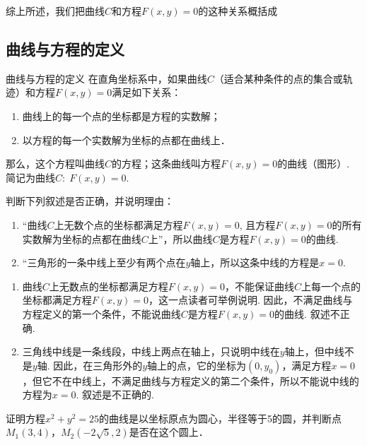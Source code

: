 综上所述，我们把曲线$C$和方程$F(x,y)=0$的这种关系概括成

\subsection{曲线与方程的定义}
\begin{thm}
    {曲线与方程的定义}
在直角坐标系中，如果曲线$C$（适合某种条件的点的集合或轨迹）和方程$F(x,y)=0$满足如下关系：
\begin{enumerate}
    \item 曲线上的每一个点的坐标都是方程的实数解；
    \item 以方程的每一个实数解为坐标的点都在曲线上．
\end{enumerate}
那么，这个方程叫曲线$C$的方程；这条曲线叫方程$F(x,y)=0$的曲线（图形）. 简记为曲线$C:\; F(x,y)=0$.
\end{thm}

\begin{example}
    判断下列叙述是否正确，并说明理由：
\begin{enumerate}[(1)]
    \item “曲线$C$上无数个点的坐标都满足方程$F(x,y)=0$, 且方程$F(x,y)=0$的所有实数解为坐标的点都在曲线$C$上”，所以曲线$C$是方程$F(x,y)=0$的曲线.
    \item “三角形的一条中线上至少有两个点在$y$轴上，所以这条中线的方程是$x=0$.
\end{enumerate}
\end{example}

\begin{solution}
\begin{enumerate}[(1)]
\item 曲线$C$上无数点的坐标都满足方程$F(x,y)=0$，不能保证曲线$C$上每一个点的坐标都满足方程$F(x,y)=0$，这一点读者可举例说明. 因此，不满足曲线与方程定义的第一个条件，不能说曲线$C$是方程$F(x,y)=0$的曲线. 叙述不正确.
\item 三角线中线是一条线段，中线上两点在轴上，只说明中线在$y$轴上，但中线不是$y$轴. 因此，在三角形外的$y$轴上的点，它的坐标为$(0,y_0)$，满足方程$x=0$，但它不在中线上，不满足曲线与方程定义的第二个条件，所以不能说中线的方程为$x=0$. 叙述是不正确的.
\end{enumerate}
\end{solution}

\begin{example}
    证明方程$x^2+y^2=25$的曲线是以坐标原点为圆心，半径等于5的圆，并判断点$M_1(3,4)$，$M_2(-2\sqrt{5},2)$是否在这个圆上．
\end{example}

